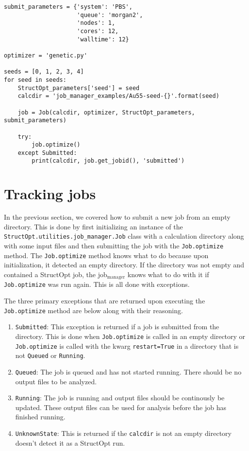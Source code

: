\documentclass[11pt]{article}
\begin{document}
\begin{verbatim}
submit_parameters = {'system': 'PBS',
                     'queue': 'morgan2',
                     'nodes': 1,
                     'cores': 12,
                     'walltime': 12}

optimizer = 'genetic.py'

seeds = [0, 1, 2, 3, 4]
for seed in seeds:
    StructOpt_parameters['seed'] = seed
    calcdir = 'job_manager_examples/Au55-seed-{}'.format(seed)

    job = Job(calcdir, optimizer, StructOpt_parameters, submit_parameters)

    try:
        job.optimize()
    except Submitted:
        print(calcdir, job.get_jobid(), 'submitted')
\end{verbatim}

\section{Tracking jobs}
\label{sec:orgheadline6}
In the previous section, we covered how to submit a new job from an empty directory. This is done by first initializing an instance of the \texttt{StructOpt.utilities.job\_manager.Job} class with a calculation directory along with some input files and then submitting the job with the \texttt{Job.optimize} method. The \texttt{Job.optimize} method knows what to do because upon initialization, it detected an empty directory. If the directory was not empty and contained a StructOpt job, the job\(_{\text{manager}}\) knows what to do with it if \texttt{Job.optimize} was run again. This is all done with exceptions.

The three primary exceptions that are returned upon executing the \texttt{Job.optimize} method are below along with their reasoning.

\begin{enumerate}
\item \texttt{Submitted}: This exception is returned if a job is submitted from the directory. This is done when \texttt{Job.optimize} is called in an empty directory or \texttt{Job.optimize} is called with the kwarg \texttt{restart=True} in a directory that is not \texttt{Queued} or \texttt{Running}.

\item \texttt{Queued}: The job is queued and has not started running. There should be no output files to be analyzed.

\item \texttt{Running}: The job is running and output files should be continously be updated. These output files can be used for analysis before the job has finished running.

\item \texttt{UnknownState}: This is returned if the \texttt{calcdir} is not an empty directory doesn't detect it as a StructOpt run.
\end{enumerate}
\end{document}
